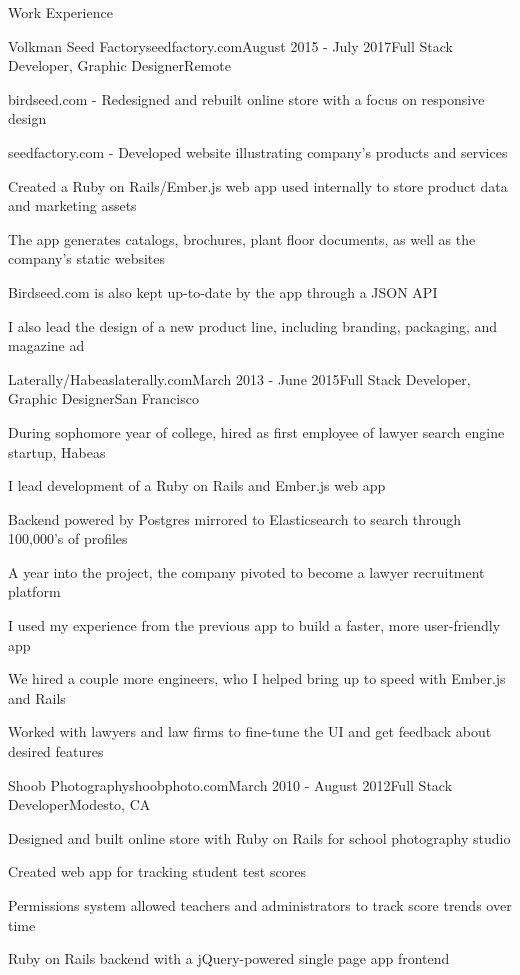 \documentclass{resume} %
\begin{document}
\begin{rSection}{Work Experience}

\begin{rSubsection}{Volkman Seed Factory}{seedfactory.com}{August 2015 - July 2017}{Full Stack Developer, Graphic Designer}{Remote}
\item birdseed.com - Redesigned and rebuilt online store with a focus on responsive design
\item seedfactory.com - Developed website illustrating company's products and services
\item Created a Ruby on Rails/Ember.js web app used internally to store product data and marketing assets
\item The app generates catalogs, brochures, plant floor documents, as well as the company's static websites
\item Birdseed.com is also kept up-to-date by the app through a JSON API
\item I also lead the design of a new product line, including branding, packaging, and magazine ad
\end{rSubsection}

\begin{rSubsection}{Laterally/Habeas}{laterally.com}{March 2013 - June 2015}{Full Stack Developer, Graphic Designer}{San Francisco}
\item During sophomore year of college, hired as first employee of lawyer search engine startup, Habeas
\item I lead development of a Ruby on Rails and Ember.js web app
\item Backend powered by Postgres mirrored to Elasticsearch to search through 100,000's of profiles
\item A year into the project, the company pivoted to become a lawyer recruitment platform
\item I used my experience from the previous app to build a faster, more user-friendly app
\item We hired a couple more engineers, who I helped bring up to speed with Ember.js and Rails
\item Worked with lawyers and law firms to fine-tune the UI and get feedback about desired features
\end{rSubsection}

\begin{rSubsection}{Shoob Photography}{shoobphoto.com}{March 2010 - August 2012}{Full Stack Developer}{Modesto, CA}
\item Designed and built online store with Ruby on Rails for school photography studio
\item Created web app for tracking student test scores
\item Permissions system allowed teachers and administrators to track score trends over time
\item Ruby on Rails backend with a jQuery-powered single page app frontend
\end{rSubsection}

\end{rSection}
\end{document}
